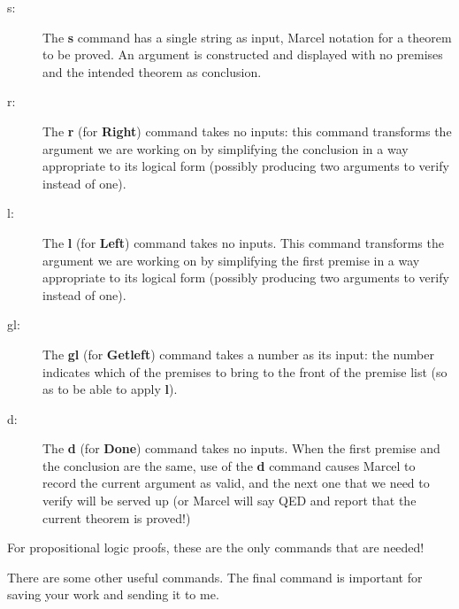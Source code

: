 \documentclass[12pt]{article}
\begin{document}
\begin{description}

\item[s:]  The {\bf s}  command has a single string as input, Marcel notation for a theorem to be proved.  An argument is constructed and displayed with no premises and the intended theorem as conclusion.

\item[r:]  The {\bf r} (for {\bf Right}) command takes no inputs:  this command transforms
the argument we are working on by simplifying the conclusion in a way appropriate to its logical form (possibly producing two arguments to verify instead of one).

\item[l:]  The {\bf l} (for {\bf Left}) command takes no inputs.  This command transforms the argument we
are working on by simplifying the first premise in a way appropriate to its logical form (possibly producing two arguments to verify instead of one).

\item[gl:]  The {\bf gl} (for {\bf Getleft}) command takes a number as its input:  the number indicates which of the premises to bring to the front of the premise list (so as to be able to apply {\bf l}).

\item[d:]  The {\bf d} (for {\bf Done}) command takes no inputs.  When the first premise and the conclusion are the same, use of the {\bf d} command causes Marcel to record the current argument as valid, and the next one that we need to verify will be served up (or Marcel will say QED and report that the current theorem is proved!)

\end{description}

For propositional logic proofs, these are the only commands that are needed!

There are some other useful commands.  The final command is important for saving your work and sending it to me.
\end{document}
